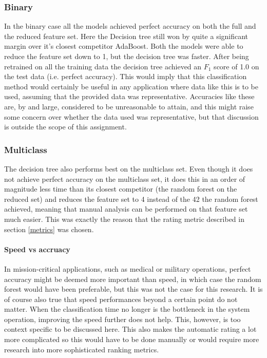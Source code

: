 \documentclass[british]{article}
\begin{document}
	\subsubsection{Binary}  In the binary case all the models achieved perfect accuracy on both the full and the reduced feature set. Here the Decision tree still won by quite a significant margin over it's closest competitor AdaBoost. Both the models were able to reduce the feature set down to 1, but the decision tree was faster. After being retrained on all the training data the decision tree achieved an $F_1$ score of 1.0 on the test data (i.e. perfect accuracy). This would imply that this classification method would certainly be useful in any application where data like this is to be used, assuming that the provided data was representative. Accuracies like these are, by and large, considered to be unreasonable to attain, and this might raise some concern over whether the data used was representative, but that discussion is outside the scope of this assignment.  
	
	\subsubsection{Multiclass} The decision tree also performs best on the multiclass set. Even though it does not achieve perfect accuracy on the multiclass set, it does this in an order of magnitude less time than its closest competitor (the random forest on the reduced set) and reduces the feature set to 4 instead of the 42 the random forest achieved, meaning that manual analysis can be performed on that feature set much easier. This was exactly the reason that the rating metric described in section \ref{metrics} was chosen.
	
	\paragraph{Speed vs accruacy}  In mission-critical applications, such as medical or military operations, perfect accuracy might be deemed more important than speed, in which case the random forest would have been preferable, but this was not the case for this research. It is of course also true that speed performances beyond a certain point do not matter. When the classification time no longer is the bottleneck in the system operation, improving the speed further does not help. This, however, is too context specific to be discussed here. This also makes the automatic rating a lot more complicated so this would have to be done manually or would require more research into more sophisticated ranking metrics.  
	
\end{document}
